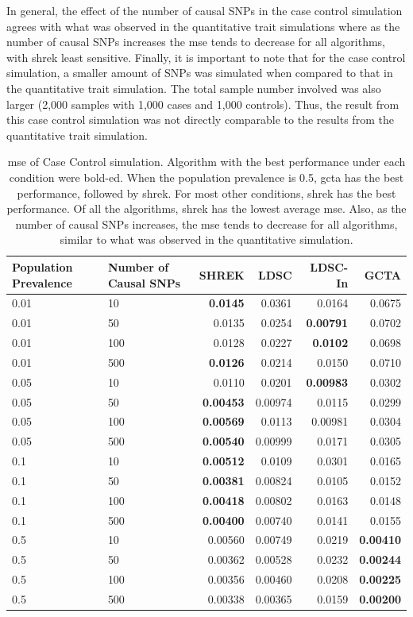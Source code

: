 		In general, the effect of the number of causal \glspl{SNP} in the case control simulation agrees with what was observed in the quantitative trait simulations where as the number of causal \glspl{SNP} increases the \gls{mse} tends to decrease for all algorithms, with \gls{shrek} least sensitive.
		Finally, it is important to note that for the case control simulation, a smaller amount of \glspl{SNP} was simulated when compared to that in the quantitative trait simulation. 
		The total sample number involved was also larger (2,000 samples with 1,000 cases and 1,000 controls).
		Thus, the result from this case control simulation was not directly comparable to the results from the quantitative trait simulation.
		\begin{table}
			\centering
			\begin{tabular}{p{2cm}p{2.4cm}rrrr}
				\toprule
				Population Prevalence&	Number of Causal SNPs&	SHREK&	LDSC&	LDSC-In&	GCTA \\
				\midrule
				0.01&	10&	\textbf{0.0145}&	0.0361&	0.0164&	0.0675\\
				0.01&	50&	0.0135&	0.0254&	\textbf{0.00791}&	0.0702\\
				0.01&	100&	0.0128&	0.0227&	\textbf{0.0102}&	0.0698\\
				0.01&	500&	\textbf{0.0126}&	0.0214&	0.0150&	0.0710\\
				0.05&	10&	0.0110&	0.0201&	\textbf{0.00983}&	0.0302\\
				0.05&	50&	\textbf{0.00453}&	0.00974&	0.0115&	0.0299\\
				0.05&	100&	\textbf{0.00569}&	0.0113&	0.00981&	0.0304\\
				0.05&	500&	\textbf{0.00540}&	0.00999&	0.0171&	0.0305\\
				0.1&	10&	\textbf{0.00512}&	0.0109&	0.0301&	0.0165\\
				0.1&	50&	\textbf{0.00381}&	0.00824&	0.0105&	0.0152\\
				0.1&	100&	\textbf{0.00418}&	0.00802&	0.0163&	0.0148\\
				0.1&	500&	\textbf{0.00400}&	0.00740&	0.0141&	0.0155\\
				0.5&	10&	0.00560&	0.00749&	0.0219&	\textbf{0.00410}\\
				0.5&	50&	0.00362&	0.00528&	0.0232&	\textbf{0.00244}\\
				0.5&	100&	0.00356&	0.00460&	0.0208&	\textbf{0.00225}\\
				0.5&	500&	0.00338&	0.00365&	0.0159&	\textbf{0.00200}\\
				\bottomrule
			\end{tabular}
			\caption[MSE of Case Control Simulation]{
				\Gls{mse} of Case Control simulation.
				Algorithm with the best performance under each condition were bold-ed.
				When the population prevalence is 0.5, \gls{gcta} has the best performance, followed by \gls{shrek}.
				For most other conditions, \gls{shrek} has the best performance. 
				Of all the algorithms, \gls{shrek} has the lowest average \gls{mse}.
				Also, as the number of causal \glspl{SNP} increases, the \gls{mse} tends to decrease for all algorithms, similar to what was observed in the quantitative simulation. 
			}
			\label{tab:mseCC}
		\end{table}
